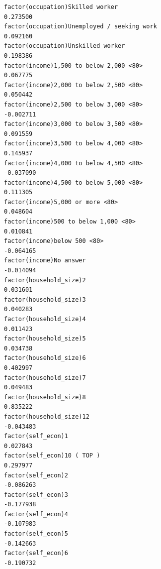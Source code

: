 \documentclass[
]{article}
\begin{document}
\begin{table}
\begin{minipage}[t]{\linewidth}
{\begin{verbatim}
factor(occupation)Skilled worker                                                   0.273500
factor(occupation)Unemployed / seeking work                                        0.092160
factor(occupation)Unskilled worker                                                 0.198386
factor(income)1,500 to below 2,000 <80>                                            0.067775
factor(income)2,000 to below 2,500 <80>                                            0.050442
factor(income)2,500 to below 3,000 <80>                                           -0.002711
factor(income)3,000 to below 3,500 <80>                                            0.091559
factor(income)3,500 to below 4,000 <80>                                            0.145937
factor(income)4,000 to below 4,500 <80>                                           -0.037090
factor(income)4,500 to below 5,000 <80>                                            0.111305
factor(income)5,000 or more <80>                                                   0.048604
factor(income)500 to below 1,000 <80>                                              0.010841
factor(income)below 500 <80>                                                      -0.064165
factor(income)No answer                                                           -0.014094
factor(household_size)2                                                            0.031601
factor(household_size)3                                                            0.040283
factor(household_size)4                                                            0.011423
factor(household_size)5                                                            0.034738
factor(household_size)6                                                            0.402997
factor(household_size)7                                                            0.049483
factor(household_size)8                                                            0.835222
factor(household_size)12                                                          -0.043483
factor(self_econ)1                                                                 0.027843
factor(self_econ)10 ( TOP )                                                        0.297977
factor(self_econ)2                                                                -0.086263
factor(self_econ)3                                                                -0.177938
factor(self_econ)4                                                                -0.107983
factor(self_econ)5                                                                -0.142663
factor(self_econ)6                                                                -0.190732

\end{verbatim}}
\end{minipage}
\end{table}
\end{document}
